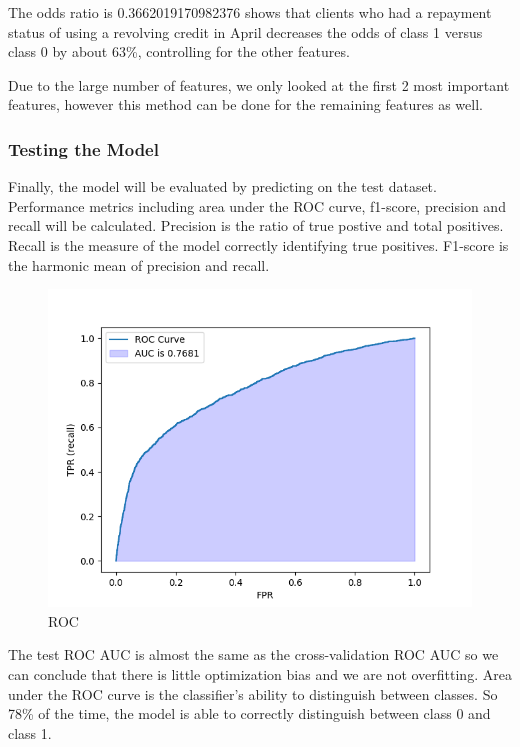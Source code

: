 \documentclass[
]{article}
\begin{document}
The odds ratio is 0.3662019170982376 shows that clients who had a
repayment status of using a revolving credit in April decreases the odds
of class 1 versus class 0 by about 63\%, controlling for the other
features.

Due to the large number of features, we only looked at the first 2 most
important features, however this method can be done for the remaining
features as well.

\hypertarget{testing-the-model}{%
\subsubsection{Testing the Model}\label{testing-the-model}}

Finally, the model will be evaluated by predicting on the test dataset.
Performance metrics including area under the ROC curve, f1-score,
precision and recall will be calculated. Precision is the ratio of true
postive and total positives. Recall is the measure of the model
correctly identifying true positives. F1-score is the harmonic mean of
precision and recall.

\begin{figure}

{\centering \includegraphics[width=0.8\linewidth]{../results/roc} 

}

\caption{ROC}\label{fig:roc}
\end{figure}

The test ROC AUC is almost the same as the cross-validation ROC AUC so
we can conclude that there is little optimization bias and we are not
overfitting. Area under the ROC curve is the classifier's ability to
distinguish between classes. So 78\% of the time, the model is able to
correctly distinguish between class 0 and class 1.
\end{document}
